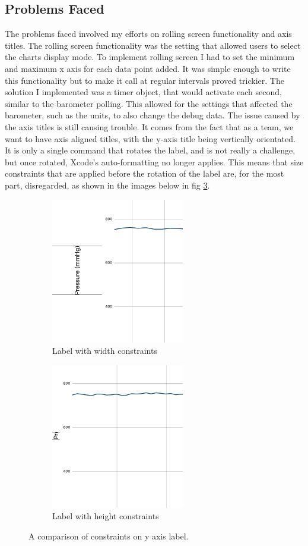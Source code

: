 \documentclass[onecolumn, draftclsnofoot,10pt, compsoc]{IEEEtran}
\begin{document}
\subsection{Problems Faced}

The problems faced involved my efforts on rolling screen functionality and axis titles.
The rolling screen functionality was the setting that allowed users to select the charts display mode.
To implement rolling screen I had to set the minimum and maximum x axis for each data point added.
It was simple enough to write this functionality but to make it call at regular intervals proved trickier.
The solution I implemented was a timer object, that would activate each second, similar to the barometer polling.
This allowed for the settings that affected the barometer, such as the units, to also change the debug data.
The issue caused by the axis titles is still causing trouble.
It comes from the fact that as a team, we want to have axis aligned titles, with the y-axis title being vertically orientated.
It is only a single command that rotates the label, and is not really a challenge, but once rotated, Xcode's auto-formatting no longer applies.
This means that size constraints that are applied before the rotation of the label are, for the most part, disregarded, as shown in the images below in fig \ref{fig:comparison}.

\begin{figure}[H]
\centering
\begin{subfigure}{.5\textwidth}
  \centering
  \includegraphics[width=.4\linewidth]{widthAxis}
  \caption{Label with width constraints}
  \label{fig:width}
\end{subfigure}%
\begin{subfigure}{.5\textwidth}
  \centering
  \includegraphics[width=.4\linewidth]{heightAxis}
  \caption{Label with height constraints}
  \label{fig:height}
\end{subfigure}
\caption{A comparison of constraints on y axis label.}
\label{fig:comparison}
\end{figure}
\end{document}
